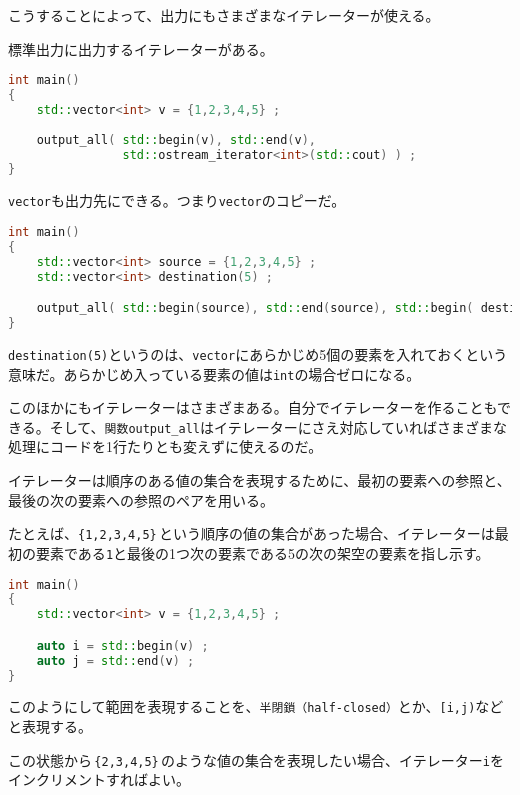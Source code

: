 こうすることによって、出力にもさまざまなイテレーターが使える。

標準出力に出力するイテレーターがある。

\begin{lstlisting}[language={C++}]
int main()
{
    std::vector<int> v = {1,2,3,4,5} ;
    
    output_all( std::begin(v), std::end(v),
                std::ostream_iterator<int>(std::cout) ) ;
}
\end{lstlisting}

\texttt{vector}も出力先にできる。つまり\texttt{vector}のコピーだ。

\begin{lstlisting}[language={C++}]
int main()
{
    std::vector<int> source = {1,2,3,4,5} ;
    std::vector<int> destination(5) ;

    output_all( std::begin(source), std::end(source), std::begin( destination ) ) ;
}
\end{lstlisting}

\texttt{destination(5)}というのは、\texttt{vector}にあらかじめ5個の要素を入れておくという意味だ。あらかじめ入っている要素の値は\texttt{int}の場合ゼロになる。

このほかにもイテレーターはさまざまある。自分でイテレーターを作ることもできる。そして、\texttt{関数output\_all}はイテレーターにさえ対応していればさまざまな処理にコードを1行たりとも変えずに使えるのだ。


イテレーターは順序のある値の集合を表現するために、最初の要素への参照と、最後の次の要素への参照のペアを用いる。

たとえば、\texttt{\{1,2,3,4,5\}}\,という順序の値の集合があった場合、イテレーターは最初の要素である\texttt{1}と最後の1つ次の要素である5の次の架空の要素を指し示す。

\begin{lstlisting}[language={C++}]
int main()
{
    std::vector<int> v = {1,2,3,4,5} ;

    auto i = std::begin(v) ;
    auto j = std::end(v) ;
}
\end{lstlisting}

このようにして範囲を表現することを、\texttt{半閉鎖（half-closed）}とか、\texttt{[i,j)}などと表現する。

この状態から\,\texttt{\{2,3,4,5\}}\,のような値の集合を表現したい場合、イテレーター\texttt{i}をインクリメントすればよい。

